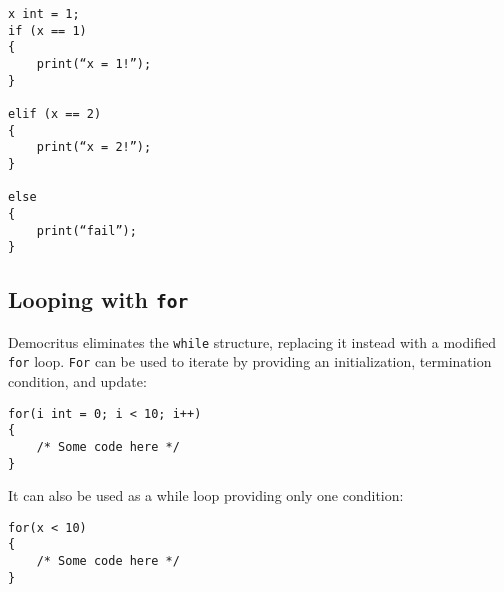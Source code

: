             \begin{lstlisting}
x int = 1;
if (x == 1)
{
    print(“x = 1!”);
}

elif (x == 2)
{
    print(“x = 2!”);
}

else 
{
    print(“fail”);
}
            \end{lstlisting}

        \subsection{Looping with \texttt{for}}
            Democritus eliminates the \texttt{while} structure, replacing it instead with a modified \texttt{for} loop. \texttt{For} can be used to iterate by providing an initialization, termination condition, and update:
            \begin{lstlisting}
for(i int = 0; i < 10; i++)
{
    /* Some code here */
}
            \end{lstlisting}

            It can also be used as a while loop providing only one condition:

            \begin{lstlisting}
for(x < 10)
{
    /* Some code here */
}
            \end{lstlisting}


